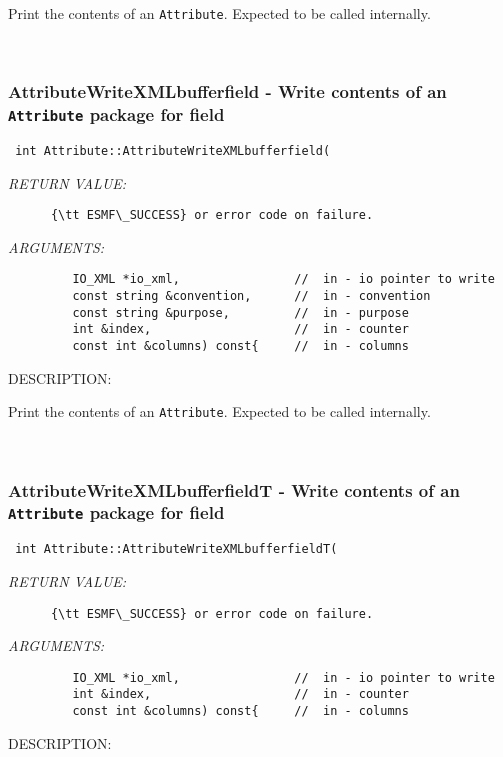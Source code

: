       Print the contents of an {\tt Attribute}.  Expected to be
      called internally.
   
 
\mbox{}\hrulefill\
 
\subsubsection [AttributeWriteXMLbufferfield] {AttributeWriteXMLbufferfield - Write contents of an {\tt Attribute} package for field}


  
\begin{verbatim} int Attribute::AttributeWriteXMLbufferfield(\end{verbatim}{\em RETURN VALUE:}
\begin{verbatim}      {\tt ESMF\_SUCCESS} or error code on failure.\end{verbatim}{\em ARGUMENTS:}
\begin{verbatim}         IO_XML *io_xml,                //  in - io pointer to write
         const string &convention,      //  in - convention
         const string &purpose,         //  in - purpose
         int &index,                    //  in - counter
         const int &columns) const{     //  in - columns\end{verbatim}
{\sf DESCRIPTION:\\ }


      Print the contents of an {\tt Attribute}.  Expected to be
      called internally.
   
 
\mbox{}\hrulefill\
 
\subsubsection [AttributeWriteXMLbufferfieldT] {AttributeWriteXMLbufferfieldT - Write contents of an {\tt Attribute} package for field}


  
\begin{verbatim} int Attribute::AttributeWriteXMLbufferfieldT(\end{verbatim}{\em RETURN VALUE:}
\begin{verbatim}      {\tt ESMF\_SUCCESS} or error code on failure.\end{verbatim}{\em ARGUMENTS:}
\begin{verbatim}         IO_XML *io_xml,                //  in - io pointer to write
         int &index,                    //  in - counter
         const int &columns) const{     //  in - columns\end{verbatim}
{\sf DESCRIPTION:\\ }


